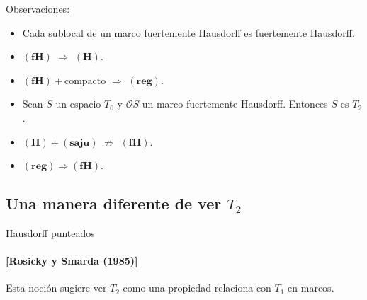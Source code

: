 \documentclass[compress,12pt]{beamer}
\begin{document}
\begin{frame}
\begin{block}{Observaciones:}
    \begin{itemize}
    \item Cada sublocal de un marco fuertemente Hausdorff es fuertemente Hausdorff.
    \item<2-> $\mathbf{(fH)}$ $\Rightarrow$ $\mathbf{(H)}$.
    \item<3-> $\mathbf{(fH)} + \mbox{compacto}$ $\Rightarrow$ $\mathbf{(reg)}$.
    \item<4-> Sean $S$ un espacio $T_0$ y $\mathcal{O}S$ un marco fuertemente Hausdorff. Entonces $S$ es $T_2$.
    \item<5-> $\mathbf{(H)} + \mathbf{(saju)}$ $\nRightarrow$ $\mathbf{(fH)}$.
    \item<6-> $\mathbf{(reg)} \Rightarrow \mathbf{(fH)}$.
    \end{itemize}
\end{block}
    
\end{frame}

\subsection{Una manera diferente de ver $T_2$}
\begin{frame}{Hausdorff punteados}
\framesubtitle{[Rosicky y Smarda (1985)]}

Esta noción sugiere ver $T_2$ como una propiedad relaciona con $T_1$ en marcos.\\


\end{frame}
\end{document}
